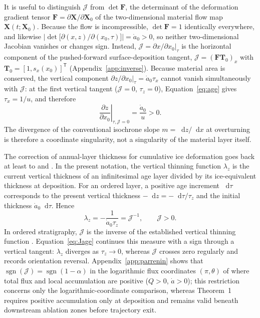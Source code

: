 \documentclass[review]{igs}
\begin{document}
It is useful to distinguish \(\mathcal{J}\) from \(\det\bm{F}\), the determinant of the deformation gradient tensor \(\bm{F}=\partial\bm{X}/\partial\bm{X}_0\) of the two-dimensional material flow map \(\bm{X}(t;\bm{X}_0)\). Because the flow is incompressible, \(\det\bm{F}=1\) identically everywhere, and likewise \(\left|\det\bigl[\partial(x,z)/\partial(x_0,\tau)\bigr]\right|=\dot a_0>0\), so neither two-dimensional Jacobian vanishes or changes sign. Instead, \(\mathcal{J}=\left.\partial x/\partial x_0\right|_{\tau}\) is the horizontal component of the pushed-forward surface-deposition tangent, \(\mathcal{J}=(\bm{F}\bm{T}_0)_x\) with \(\bm{T}_0=[1,s_x(x_0)]^{\mathsf T}\) (Appendix~\ref{app:inverse}). Because material area is conserved, the vertical component \(\left.\partial z/\partial x_0\right|_{\tau}=\dot a_0\tau_x\) cannot vanish simultaneously with \(\mathcal{J}\): at the first vertical tangent (\(\mathcal{J}=0\), \(\tau_z=0\)), Equation~\ref{eq:age} gives \(\tau_x=1/u\), and therefore
\begin{equation}
\left.\frac{\partial z}{\partial x_0}\right|_{\tau,\mathcal{J}=0}
=\frac{\dot a_0}{u}>0.
\label{eq:verticalregular}
\end{equation}
The divergence of the conventional isochrone slope \(m=\mathop{}\!\mathrm{d} z/\mathop{}\!\mathrm{d} x\) at overturning is therefore a coordinate singularity, not a singularity of the material layer itself.

The correction of annual-layer thickness for cumulative ice deformation goes back at least to \citet{Nye1963} and \citet{DansgaardJohnsen1969}. In the present notation, the vertical thinning function \(\lambda_z\) is the current vertical thickness of an infinitesimal age layer divided by its ice-equivalent thickness at deposition. For an ordered layer, a positive age increment \(\mathop{}\!\mathrm{d}\tau\) corresponds to the present vertical thickness \(-\mathop{}\!\mathrm{d} z=-\mathop{}\!\mathrm{d}\tau/\tau_z\) and the initial thickness \(\dot a_0\mathop{}\!\mathrm{d}\tau\). Hence
\begin{equation}
\lambda_z
=-\frac{1}{\dot a_0\tau_z}
=\mathcal{J}^{-1},
\qquad \mathcal{J}>0.
\label{eq:thinningrelation}
\end{equation}
In ordered stratigraphy, \(\mathcal{J}\) is the inverse of the established vertical thinning function \citep{Parrenin2013,ParreninChungMartin2025}. Equation~\ref{eq:Jage} continues this measure with a sign through a vertical tangent: \(\lambda_z\) diverges as \(\tau_z\rightarrow0\), whereas \(\mathcal{J}\) crosses zero regularly and records orientation reversal. Appendix~\ref{app:parrenin} shows that \(\operatorname{sgn}(\mathcal{J})=\operatorname{sgn}(1-\alpha)\) in the logarithmic flux coordinates \((\pi,\theta)\) of \citet{ParreninHindmarsh2007} where total flux and local accumulation are positive (\(Q>0\), \(\dot a>0\)); this restriction concerns only the logarithmic-coordinate comparison, whereas Theorem~1 requires positive accumulation only at deposition and remains valid beneath downstream ablation zones before trajectory exit.
\end{document}
